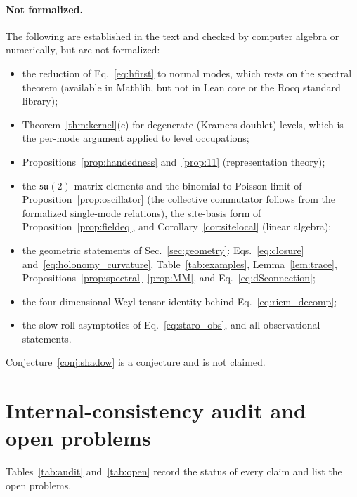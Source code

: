 \documentclass[reprint,aps,prd,amsmath,amssymb,superscriptaddress,nofootinbib,floatfix]{revtex4-2}
\theoremstyle{plain}
\theoremstyle{definition}
\theoremstyle{remark}
\begin{document}
\paragraph*{Not formalized.} The following are established in the text and checked by computer algebra or
numerically, but are not formalized:
\begin{itemize}
\item the reduction of Eq.~\eqref{eq:hfirst} to normal modes, which rests on the spectral theorem (available in
Mathlib, but not in Lean core or the Rocq standard library);
\item Theorem~\ref{thm:kernel}(c) for degenerate (Kramers-doublet) levels, which is the per-mode argument applied
to level occupations;
\item Propositions~\ref{prop:handedness} and~\ref{prop:11} (representation theory);
\item the $\mathfrak{su}(2)$ matrix elements and the binomial-to-Poisson limit of Proposition~\ref{prop:oscillator} (the collective
commutator follows from the formalized single-mode relations), the site-basis form of Proposition~\ref{prop:fieldeq}, and
Corollary~\ref{cor:sitelocal} (linear algebra);
\item the geometric statements of Sec.~\ref{sec:geometry}: Eqs.~\eqref{eq:closure} and~\eqref{eq:holonomy_curvature},
Table~\ref{tab:examples}, Lemma~\ref{lem:trace}, Propositions~\ref{prop:spectral}--\ref{prop:MM}, and Eq.~\eqref{eq:dSconnection};
\item the four-dimensional Weyl-tensor identity behind Eq.~\eqref{eq:riem_decomp};
\item the slow-roll asymptotics of Eq.~\eqref{eq:staro_obs}, and all observational statements.
\end{itemize}
Conjecture~\ref{conj:shadow} is a conjecture and is not claimed.

\section{Internal-consistency audit and open problems}
\label{sec:audit}

Tables~\ref{tab:audit} and~\ref{tab:open} record the status of every claim and list the open problems.
\end{document}
